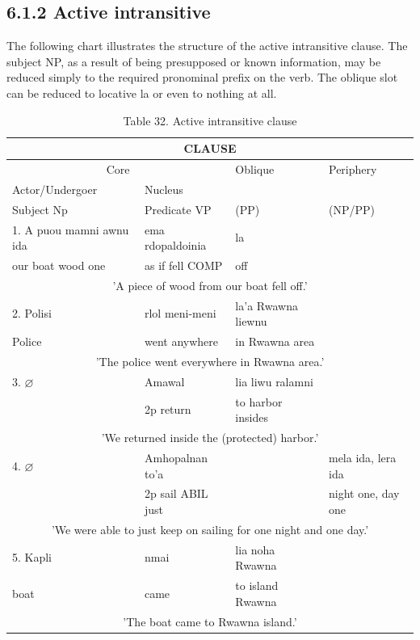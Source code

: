 \documentclass[10pt]{article}
\begin{document}
\subsection*{6.1.2 Active intransitive}
The following chart illustrates the structure of the active intransitive clause. The subject NP, as a result of being presupposed or known information, may be reduced simply to the required pronominal prefix on the verb. The oblique slot can be reduced to locative la or even to nothing at all.

\begin{table}[h]
\begin{center}
\captionsetup{labelformat=empty}
\caption{Table 32. Active intransitive clause}
\begin{tabular}{|l|l|l|l|}
\hline
\multicolumn{4}{|c|}{CLAUSE} \\
\hline
\multicolumn{2}{|c|}{Core} & Oblique & Periphery \\
\hline
Actor/Undergoer & Nucleus &  &  \\
\hline
Subject Np & Predicate VP & (PP) & (NP/PP) \\
\hline
1. A puou mamni awnu ida & ema rdopaldoinia & la &  \\
\hline
our boat wood one & as if fell COMP & off &  \\
\hline
\multicolumn{4}{|c|}{'A piece of wood from our boat fell off.'} \\
\hline
2. Polisi & rlol meni-meni & la'a Rwawna liewnu &  \\
\hline
Police & went anywhere & in Rwawna area &  \\
\hline
\multicolumn{4}{|c|}{'The police went everywhere in Rwawna area.'} \\
\hline
3. \(\varnothing\) & Amawal & lia liwu ralamni &  \\
\hline
 & 2p return & to harbor insides &  \\
\hline
\multicolumn{4}{|c|}{'We returned inside the (protected) harbor.'} \\
\hline
4. \(\varnothing\) & Amhopalnan to'a &  & mela ida, lera ida \\
\hline
 & 2p sail ABIL just &  & night one, day one \\
\hline
\multicolumn{4}{|c|}{'We were able to just keep on sailing for one night and one day.'} \\
\hline
5. Kapli & nmai & lia noha Rwawna &  \\
\hline
boat & came & to island Rwawna &  \\
\hline
\multicolumn{4}{|c|}{'The boat came to Rwawna island.'} \\

\end{tabular}
\end{center}
\end{table}
\end{document}
